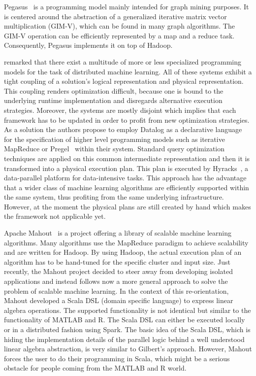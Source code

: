Pegasus~\cite{kang:2009a} is a programming model mainly intended for graph mining purposes.
It is centered around the abstraction of a generalized iterative matrix vector multiplication (GIM-V), which can be found in many graph algorithms.
The GIM-V operation can be efficiently represented by a map and a reduce task.
Consequently, Pegasus implements it on top of Hadoop.

\Textcite{bu:apa2012a} remarked that there exist a multitude of more or less specialized programming models for the task of distributed machine learning.
All of these systems exhibit a tight coupling of a solution's logical representation and physical representation.
This coupling renders optimization difficult, because one is bound to the underlying runtime implementation and disregards alternative execution strategies.
Moreover, the systems are mostly disjoint which implies that each framework has to be updated in order to profit from new optimization strategies.
As a solution the authors propose to employ Datalog as a declarative language for the specification of higher level programming models such as iterative MapReduce or Pregel~\cite{malewicz:2010a} within their system.
Standard query optimization techniques are applied on this common intermediate representation and then it is transformed into a physical execution plan.
This plan is executed by Hyracks~\cite{borkar:2011a}, a data-parallel platform for data-intensive tasks.
This approach has the advantage that a wider class of machine learning algorithms are efficiently supported within the same system, thus profiting from the same underlying infrastructure.
However, at the moment the physical plans are still created by hand which makes the framework not applicable yet.

Apache Mahout~\cite{mahout:2011a} is a project offering a library of scalable machine learning algorithms.
Many algorithms use the MapReduce paradigm to achieve scalability and are written for Hadoop.
By using Hadoop, the actual execution plan of an algorithm has to be hand-tuned for the specific cluster and input size.
Just recently, the Mahout project decided to steer away from developing isolated applications and instead follows now a more general approach to solve the problem of scalable machine learning.
In the context of this re-orientation, Mahout developed a Scala DSL (domain specific language) to express linear algebra operations.
The supported functionality is not identical but similar to the functionality of MATLAB and R.
The Scala DSL can either be executed locally or in a distributed fashion using Spark.
The basic idea of the Scala DSL, which is hiding the implementation details of the parallel logic behind a well understood linear algebra abstraction, is very similar to Gilbert's approach.
However, Mahout forces the user to do their programming in Scala, which might be a serious obstacle for people coming from the MATLAB and R world. 

